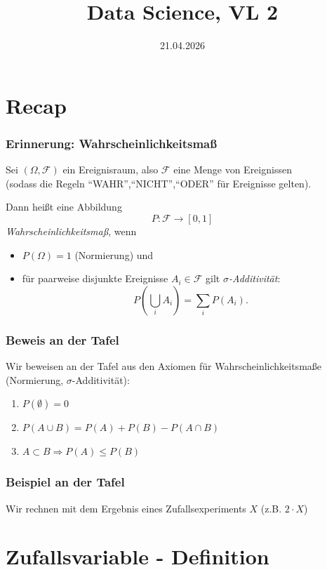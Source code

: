 

\title{Data Science, VL 2}
\date{21.04.2026}



\begin{frame}
  \titlepage
\end{frame}

\section{Recap}

\begin{frame}\frametitle{Erinnerung: Wahrscheinlichkeitsmaß}
  Sei $(\Omega, \mathcal{F})$ ein Ereignisraum, also $\mathcal{F}$ eine Menge von Ereignissen\\
  (sodass die Regeln ``WAHR'',``NICHT'',``ODER'' für Ereignisse gelten).

  Dann heißt eine Abbildung
  \[P \colon \mathcal{F} \to [0,1]\]
  \emph{Wahrscheinlichkeitsmaß}, wenn
  \begin{itemize}
    \item $P(\Omega) = 1$ (Normierung) und
    \item für paarweise disjunkte Ereignisse $A_i \in \mathcal{F}$ gilt
      \emph{$\sigma$-Additivität}:
      \[P\left( \bigcup_{i} A_i\right) = \sum_i P\left(A_i\right).\]
  \end{itemize}
\end{frame}

\begin{frame}\frametitle{Beweis an der Tafel}
  Wir beweisen an der Tafel aus den Axiomen für Wahrscheinlichkeitsmaße (Normierung, $\sigma$-Additivität):
  \begin{enumerate}
    \item $P(\emptyset) = 0$
    \item $P(A\cup B) =P(A) + P(B) - P(A\cap B)$
    \item $A \subset B \Rightarrow P(A) \leq P(B)$
  \end{enumerate}
\end{frame}

\begin{frame}\frametitle{Beispiel an der Tafel}
  Wir rechnen mit dem Ergebnis eines Zufallsexperiments $X$ (z.B. $2\cdot X$)
\end{frame}

\section{Zufallsvariable - Definition}

